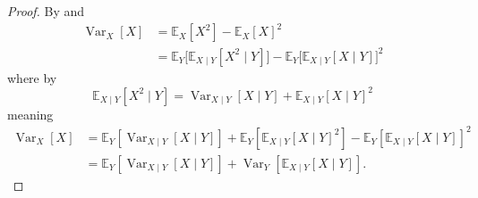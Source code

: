 \begin{proof}
	By  and 
	\begin{equation}
		\begin{split}
			\operatorname{Var}_X[X] &= \mathbb{E}_X[X^2] - \mathbb{E}_X[X]^2\\
			&= \mathbb{E}_Y\big[\mathbb{E}_{X\mid Y}[X^2\mid Y]\big] - \mathbb{E}_Y\big[\mathbb{E}_{X\mid Y}[X\mid Y]\big]^2
		\end{split}
	\end{equation}
	where by 
	\begin{equation}
		\mathbb{E}_{X\mid Y}[X^2\mid Y] = \operatorname{Var}_{X\mid Y}[X\mid Y] + \mathbb{E}_{X\mid Y}[X\mid Y]^2
	\end{equation}
	meaning
	\begin{equation}
		\begin{split}
			\operatorname{Var}_X[X]
			&= \mathbb{E}_Y[\operatorname{Var}_{X\mid Y}[X\mid Y]] + \mathbb{E}_Y[\mathbb{E}_{X\mid Y}[X\mid Y]^2] - \mathbb{E}_Y[\mathbb{E}_{X\mid Y}[X\mid Y]]^2\\
			& =\mathbb{E}_Y[\operatorname{Var}_{X\mid Y}[X\mid Y]] + \operatorname{Var}_Y[\mathbb{E}_{X\mid Y}[X\mid Y]].
		\end{split}
	\end{equation}
\end{proof}

